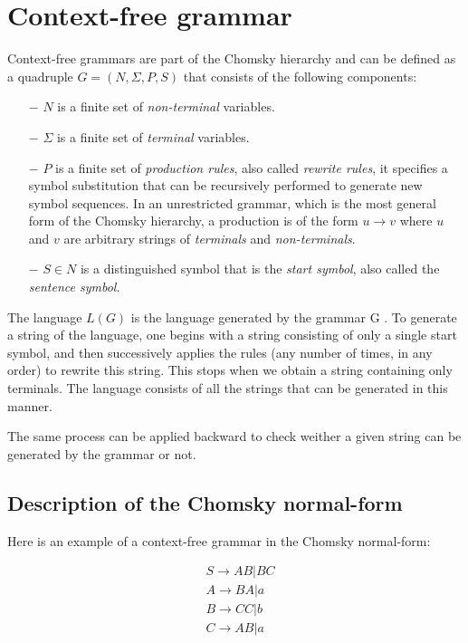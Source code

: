 
\section{Context-free grammar}

Context-free grammars are part of the Chomsky hierarchy \cite{grammars_hierarchy, grammars} and can be defined as a quadruple $G = (N, \Sigma, P, S)$ that consists of the following components:

\begin{itemize}
    \item[$-$] $N$ is a finite set of \textit{non-terminal} variables.
    \item[$-$] $\Sigma$ is a finite set of \textit{terminal} variables.
    \item[$-$] $P$ is a finite set of \textit{production rules}, also called \textit{rewrite rules}, it specifies a symbol substitution that can be recursively performed to generate new symbol sequences. In an unrestricted grammar, which is the most general form of the Chomsky hierarchy, a production is of the form $u \to v$ where $u$ and $v$ are arbitrary strings of \textit{terminals} and \textit{non-terminals}.
    \item[$-$] $S \in N$ is a distinguished symbol that is the \textit{start symbol}, also called the \textit{sentence symbol}.
\end{itemize}

The language $L(G)$ is the language generated by the grammar G \cite{intro_automata}.
To generate a string of the language, one begins with a string consisting of only a single start symbol, and then successively applies the rules (any number of times, in any order) to rewrite this string. 
This stops when we obtain a string containing only terminals.
The language consists of all the strings that can be generated in this manner.

The same process can be applied backward to check weither a given string can be generated by the grammar or not.

\subsection{Description of the Chomsky normal-form}

Here is an example of a context-free grammar in the Chomsky normal-form:

\begin{align*} 
&S \to AB|BC\\
&A \to BA|a\\
&B \to CC|b\\
&C \to AB|a
\end{align*}


